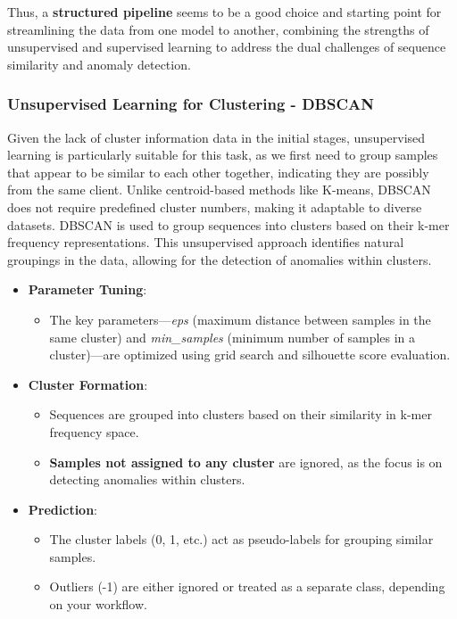 Thus, a \textbf{structured pipeline} seems to be a good choice and starting point for streamlining the data from one model to another, combining the strengths of unsupervised and supervised learning to address the dual challenges of sequence similarity and anomaly detection.

\subsubsection{Unsupervised Learning for Clustering - DBSCAN}
Given the lack of cluster information data in the initial stages, unsupervised learning is particularly suitable for this task, as we first need to group samples that appear to be similar to each other together, indicating they are possibly from the same client. 
Unlike centroid-based methods like K-means, DBSCAN does not require predefined cluster numbers, making it adaptable to diverse datasets.
DBSCAN is used to group sequences into clusters based on their k-mer frequency representations. This unsupervised approach identifies natural groupings in the data, allowing for the detection of anomalies within clusters.

\begin{itemize}
    \item \textbf{Parameter Tuning}:
    \begin{itemize}
        \item The key parameters—\textit{eps} (maximum distance between samples in the same cluster) and \textit{min\_samples} (minimum number of samples in a cluster)—are optimized using grid search and silhouette score evaluation.
    \end{itemize}

    \item \textbf{Cluster Formation}:
    \begin{itemize}
        \item Sequences are grouped into clusters based on their similarity in k-mer frequency space.
        \item \textbf{Samples not assigned to any cluster} are ignored, as the focus is on detecting anomalies within clusters.
    \end{itemize}

    \item \textbf{Prediction}:
    \begin{itemize}
        \item The cluster labels (0, 1, etc.) act as pseudo-labels for grouping similar samples.
        \item Outliers (-1) are either ignored or treated as a separate class, depending on your workflow.
    \end{itemize}
\end{itemize}

